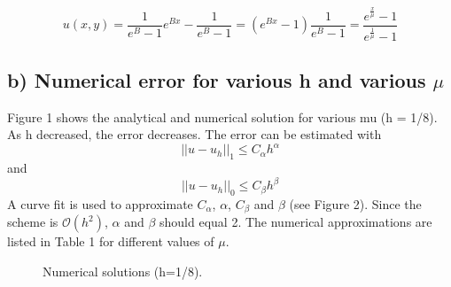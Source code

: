 \documentclass{article}
\begin{document}
$$u(x, y) = \frac {1}{e^B-1} e^{Bx}-\frac {1}{e^B-1} =(e^{Bx}-1) \frac {1}{e^B-1} = \frac {e^{\frac{x}{\mu}}-1}{e^\frac{1}{\mu}-1}$$

\subsection*{b) Numerical error for various h and various $\mu$}
Figure 1 shows the analytical and numerical solution for various mu (h = 1/8). As h decreased, the error decreases. The error can be estimated with
$$||u-u_h||_1 \leq C_{\alpha} h^{\alpha}$$
and
$$||u-u_h||_0 \leq C_{\beta} h^{\beta}$$
A curve fit is used to approximate $C_{\alpha}$, $\alpha$, $C_{\beta}$ and $\beta$ (see Figure 2). Since the scheme is $\mathcal{O}(h^2)$, $\alpha$ and $\beta$ should equal 2. The numerical approximations are listed in Table 1 for different values of $\mu$.

\begin{figure}
\centering
  \hfill
  \caption{Numerical solutions (h=1/8).}
\end{figure}
\end{document}
